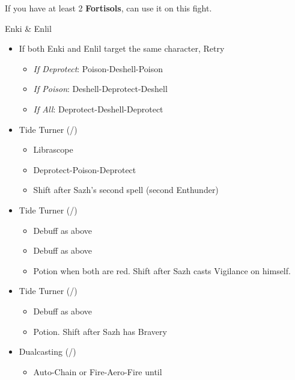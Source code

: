 If you have at least 2 \textbf{Fortisols}, can use it on this fight.
\vfill
\ 

\renewcommand{\first}{[1] Slash \& Burn (\rav/\com)}
\renewcommand{\second}{[2] Tide Turner (\sab/\syn)}
\renewcommand{\third}{[3] Tide Turner (\sab/\syn)}
\renewcommand{\fourth}{[4] Dualcasting (\rav/\rav)}
\renewcommand{\fifth}{[5] Undermine (\sab/\rav)}
\renewcommand{\sixth}{[6] Divide \& Conquer (\sab/\com)}
\begin{battle}[1:41]{Enki \& Enlil}
		\begin{itemize}
			\item If both Enki and Enlil target the same character, Retry

			      \begin{itemize}
				      \item \textit{If Deprotect}: Poison-Deshell-Poison
				      \item \textit{If Poison}: Deshell-Deprotect-Deshell
				      \item \textit{If All}: Deprotect-Deshell-Deprotect
			      \end{itemize}
			\item \second
			      \begin{itemize}
				      \item Librascope
				      \item Deprotect-Poison-Deprotect
				      \item Shift after Sazh's second spell (second Enthunder)
			      \end{itemize}
			\item \third
			      \begin{itemize}
				      \item Debuff as above
				      \item Debuff as above
				      \item Potion when both are red. Shift after Sazh casts Vigilance on himself.
			      \end{itemize}
			\item \second
			      \begin{itemize}
				      \item Debuff as above
				      \item Potion. Shift after Sazh has Bravery
			      \end{itemize}
			\item \fourth
			      \begin{itemize}
				      \item Auto-Chain or Fire-Aero-Fire until \stagger

\end{itemize}
\end{itemize}
\end{battle}
